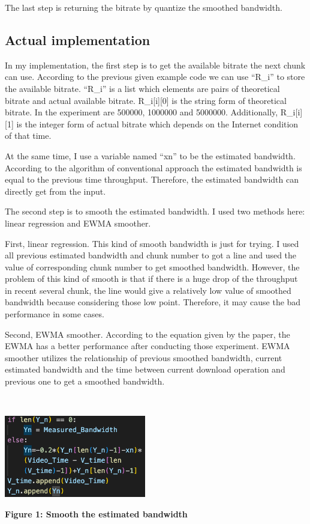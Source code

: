 The last step is returning the bitrate by quantize the smoothed bandwidth.

\subsection{Actual implementation}

In my implementation, the first step is to get the available bitrate the next chunk can use. According to the previous given example code we can use “R\_i” to store the available bitrate. “R\_i” is a list which elements are pairs of theoretical bitrate and actual available bitrate. R\_i[i][0] is the string form of theoretical bitrate. In the experiment are 500000, 1000000 and 5000000. Additionally, R\_i[i][1] is the integer form of actual bitrate which depends on the Internet condition of that time.

At the same time, I use a variable named “xn” to be the estimated bandwidth. According to the algorithm of conventional approach the estimated bandwidth is equal to the previous time throughput. Therefore, the estimated bandwidth can directly get from the input.

The second step is to smooth the estimated bandwidth. I used two methods here: linear regression and EWMA smoother.

First, linear regression. This kind of smooth bandwidth is just for trying. I used all previous estimated bandwidth and chunk number to got a line and used the value of corresponding chunk number to get smoothed bandwidth. However, the problem of this kind of smooth is that if there is a huge drop of the throughput in recent several chunk, the line would give a relatively low value of smoothed bandwidth because considering those low point. Therefore, it may cause the bad performance in some cases.

Second, EWMA smoother. According to the equation given by the paper, the EWMA has a better performance after conducting those experiment. EWMA smoother utilizes the relationship of previous smoothed bandwidth, current estimated bandwidth and the time between current download operation and previous one to get a smoothed bandwidth.

~\\
\centerline {\includegraphics[scale = 1, width=6.2cm]{smooth}}
\centerline{\textbf {Figure 1: Smooth the estimated bandwidth}}

